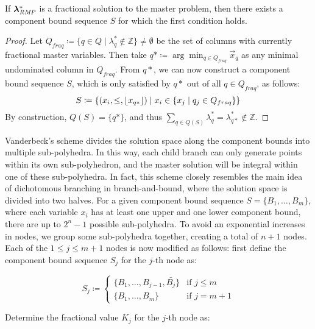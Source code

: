 \begin{proposition}
If ${\bm{\lambda}}^*_{\textit{RMP}}{}$ is a fractional solution to the master problem, then there exists a component bound sequence $S$ for which the first condition holds.
\end{proposition}

\begin{proof}\label{pr:cg_bp_bp}
Let $Q_{fraq} \coloneqq \{ q \in Q \mid \lambda_q^* \not\in \mathbb{Z} \} \neq \emptyset$ be the set of columns with currently fractional master variables. Then take $q* \coloneqq \arg\min_{q \in Q_{fraq}} \vec{x}_q$ as any minimal undominated column in $Q_{fraq}$.
From $q*$, we can now construct a component bound sequence $S$, which is only satisfied by $q*$ out of all $q \in Q_{fraq}$, as follows:
\begin{equation}
S \coloneqq \left\{ \left( x_i, \leq, \lfloor x_{q*}\rfloor \right) \mid x_i \in \{x_j \mid q_j \in Q_{fraq}\} \right\}
\end{equation}
By construction, $Q(S) = \{q*\}$, and thus $\sum_{q \in Q(S)} \lambda_q^* = \lambda_{q*}^* \not\in \mathbb{Z}$.
\end{proof}

Vanderbeck's scheme divides the solution space along the component bounds into multiple sub-polyhedra. In this way, each child branch can only generate points within its own sub-polyhedron, and the master solution will be integral within one of these sub-polyhedra. In fact, this scheme closely resembles the main idea of dichotomous branching in branch-and-bound, where the solution space is divided into two halves. For a given component bound sequence $S = \{B_1, \dots, B_m\}$, where each variable $x_i$ has at least one upper and one lower component bound, there are up to $2^n - 1$ possible sub-polyhedra. To avoid an exponential increases in nodes, we group some sub-polyhedra together, creating a total of $n + 1$ nodes. Each of the $1 \leq j \leq m+1$ nodes is now modified as follows: first define the component bound sequence $S_j$ for the $j$-th node as:

\begin{equation}
S_j \coloneqq
\begin{cases}
\{B_1, \dots, B_{j-1}, \bar{B_j}\} & \text{if } j \leq m \\
\{B_1, \dots, B_m\} & \text{if } j = m+1
\end{cases}
\end{equation}

Determine the fractional value $K_j$ for the $j$-th node as:

